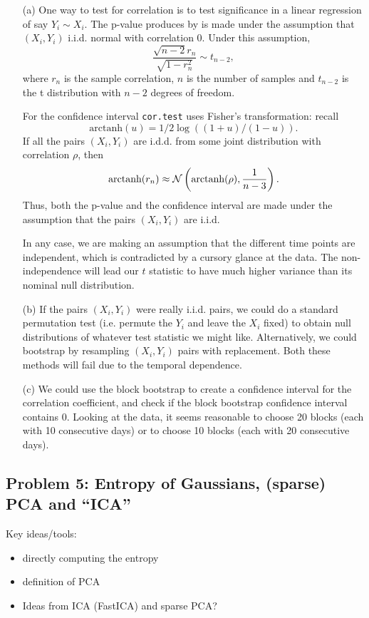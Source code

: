 \begin{enumerate}
\item[(a)] One way to test for correlation is to test significance in a linear regression of say $Y_i \sim X_i$. The p-value produces by  is made under the assumption that $(X_i,Y_i)$ i.i.d. normal with correlation 0. Under this assumption,
\[\frac{\sqrt{n-2}r_n}{\sqrt{1-r_n^2}} \sim t_{n-2}, \]
where $r_n$ is the sample correlation, $n$ is the number of samples and $t_{n-2}$ is the t distribution with $n-2$ degrees of freedom. 

For the confidence interval \texttt{cor.test} uses Fisher's transformation: recall \[\text{arctanh}(u) = 1/2 \log((1+u)/(1-u)).\] 
If all the pairs $(X_i,Y_i)$ are i.d.d. from some joint distribution with correlation $\rho$, then
$$ \text{arctanh}(r_n) \approx \mathcal{N}\left( \text{arctanh}(\rho),  \frac{1}{n-3}\right). $$
Thus, both the p-value and the confidence interval are made under the assumption that the pairs $(X_i,Y_i)$ are i.i.d.

In any case, we are making an assumption that the different time points are independent, which is contradicted by a cursory glance at the data. The non-independence will lead our $t$ statistic to have much higher variance than its nominal null distribution.
	  	
\item[(b)] If the pairs $(X_i,Y_i)$ were really i.i.d. pairs, we could do a standard permutation test (i.e. permute the $Y_i$ and leave the $X_i$ fixed) to obtain null distributions of whatever test statistic we might like. Alternatively, we could bootstrap by resampling $(X_i,Y_i)$ pairs with replacement. Both these methods will fail due to the temporal dependence.

\item[(c)] We could use the block bootstrap to create a confidence interval for the correlation coefficient, and check if the block bootstrap confidence interval contains 0. Looking at the data, it seems reasonable to choose 20 blocks (each with 10 consecutive days) or to choose 10 blocks (each with 20 consecutive days).
\end{enumerate}


\subsection*{Problem 5: Entropy of Gaussians, (sparse) PCA and ``ICA''}
Key ideas/tools:
\begin{itemize}
\item directly computing the entropy
\item definition of PCA
\item Ideas from ICA (FastICA) and sparse PCA?
\end{itemize}

